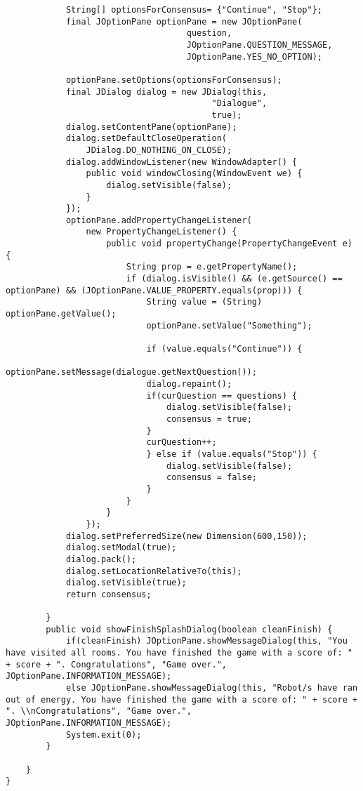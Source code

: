 \begin{lstlisting}
			String[] optionsForConsensus= {"Continue", "Stop"};
			final JOptionPane optionPane = new JOptionPane(
                                    question,
                                    JOptionPane.QUESTION_MESSAGE,
                                    JOptionPane.YES_NO_OPTION);

			optionPane.setOptions(optionsForConsensus);
            final JDialog dialog = new JDialog(this,
                                         "Dialogue",
                                         true);
            dialog.setContentPane(optionPane);
            dialog.setDefaultCloseOperation(
                JDialog.DO_NOTHING_ON_CLOSE);
            dialog.addWindowListener(new WindowAdapter() {
                public void windowClosing(WindowEvent we) {
                    dialog.setVisible(false);
                }
            });
            optionPane.addPropertyChangeListener(
                new PropertyChangeListener() {
                    public void propertyChange(PropertyChangeEvent e) {
                        String prop = e.getPropertyName();
                        if (dialog.isVisible() && (e.getSource() == optionPane) && (JOptionPane.VALUE_PROPERTY.equals(prop))) {
                        	String value = (String) optionPane.getValue();
                        	optionPane.setValue("Something");

                        	if (value.equals("Continue")) {
			                optionPane.setMessage(dialogue.getNextQuestion());
			                dialog.repaint();
			                if(curQuestion == questions) {
			                	dialog.setVisible(false);
			                	consensus = true;
			                }
			                curQuestion++;
			            	} else if (value.equals("Stop")) {
			            		dialog.setVisible(false);
			            		consensus = false;
			            	}
                        }
                    }
                });
            dialog.setPreferredSize(new Dimension(600,150));
            dialog.setModal(true);
            dialog.pack();
            dialog.setLocationRelativeTo(this);
            dialog.setVisible(true);
            return consensus;

		}
		public void showFinishSplashDialog(boolean cleanFinish) {
			if(cleanFinish) JOptionPane.showMessageDialog(this, "You have visited all rooms. You have finished the game with a score of: " + score + ". Congratulations", "Game over.", JOptionPane.INFORMATION_MESSAGE);
			else JOptionPane.showMessageDialog(this, "Robot/s have ran out of energy. You have finished the game with a score of: " + score + ". \\nCongratulations", "Game over.", JOptionPane.INFORMATION_MESSAGE);
			System.exit(0);
		}

	}
}
\end{lstlisting} 

